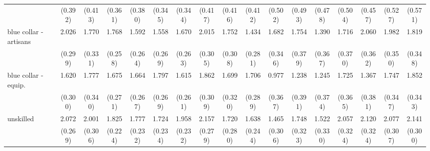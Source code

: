 {\begin{tabular}{l*{16}{c}}
                    &     (0.392)         &     (0.413)         &     (0.361)         &     (0.380)         &     (0.345)         &     (0.344)         &     (0.417)         &     (0.416)         &     (0.412)         &     (0.502)         &     (0.493)         &     (0.478)         &     (0.504)         &     (0.457)         &     (0.527)         &     (0.571)         \\
[1em]
blue collar - artisans&       2.026\sym{***}&       1.770\sym{***}&       1.768\sym{***}&       1.592\sym{***}&       1.558\sym{***}&       1.670\sym{***}&       2.015\sym{***}&       1.752\sym{***}&       1.434\sym{***}&       1.682\sym{***}&       1.754\sym{***}&       1.390\sym{***}&       1.716\sym{***}&       2.060\sym{***}&       1.982\sym{***}&       1.819\sym{***}\\
                    &     (0.299)         &     (0.331)         &     (0.258)         &     (0.264)         &     (0.269)         &     (0.263)         &     (0.305)         &     (0.308)         &     (0.281)         &     (0.346)         &     (0.379)         &     (0.367)         &     (0.370)         &     (0.362)         &     (0.350)         &     (0.348)         \\
[1em]
blue collar - equip.&       1.620\sym{***}&       1.777\sym{***}&       1.675\sym{***}&       1.664\sym{***}&       1.797\sym{***}&       1.615\sym{***}&       1.862\sym{***}&       1.699\sym{***}&       1.706\sym{***}&       0.977\sym{**} &       1.238\sym{**} &       1.245\sym{***}&       1.725\sym{***}&       1.367\sym{***}&       1.747\sym{***}&       1.852\sym{***}\\
                    &     (0.300)         &     (0.340)         &     (0.271)         &     (0.267)         &     (0.269)         &     (0.261)         &     (0.309)         &     (0.320)         &     (0.289)         &     (0.367)         &     (0.391)         &     (0.374)         &     (0.365)         &     (0.381)         &     (0.347)         &     (0.343)         \\
[1em]
unskilled           &       2.072\sym{***}&       2.001\sym{***}&       1.825\sym{***}&       1.777\sym{***}&       1.724\sym{***}&       1.958\sym{***}&       2.157\sym{***}&       1.720\sym{***}&       1.638\sym{***}&       1.465\sym{***}&       1.748\sym{***}&       1.522\sym{***}&       2.057\sym{***}&       2.120\sym{***}&       2.077\sym{***}&       2.141\sym{***}\\
                    &     (0.269)         &     (0.306)         &     (0.224)         &     (0.232)         &     (0.234)         &     (0.232)         &     (0.279)         &     (0.280)         &     (0.244)         &     (0.306)         &     (0.323)         &     (0.330)         &     (0.324)         &     (0.324)         &     (0.307)         &     (0.300)         \\

\end{tabular}}
